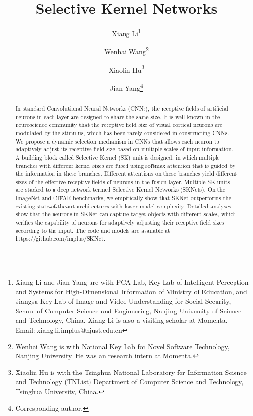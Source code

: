 \documentclass[10pt,twocolumn,letterpaper]{article}
\begin{document}
	
\title{Selective Kernel Networks}
\author[1,2]{Xiang Li\thanks{Xiang Li and Jian Yang are with PCA Lab, Key Lab of Intelligent Perception and Systems for High-Dimensional Information of Ministry of Education, and Jiangsu Key Lab of Image and Video Understanding for Social Security, School of Computer Science and Engineering, Nanjing University of Science and Technology, China. Xiang Li is also a visiting scholar at Momenta. Email: xiang.li.implus@njust.edu.cn}}
\author[3,2]{Wenhai Wang\thanks{Wenhai Wang is with National Key Lab for Novel Software Technology, Nanjing University. He was an research intern at Momenta.}}
\author[4]{Xiaolin Hu\thanks{Xiaolin Hu is with the Tsinghua National Laboratory for Information Science and Technology (TNList) Department of Computer Science and Technology, Tsinghua University, China.}}
\author[1]{Jian Yang\thanks{Corresponding author.}}


\maketitle
\begin{abstract}
	In standard Convolutional Neural Networks (CNNs), the receptive fields of artificial neurons in each layer are designed to share the same size. It is well-known in the neuroscience community that  the receptive field size of visual cortical neurons are modulated by the stimulus, which has been rarely considered in constructing CNNs. We propose a dynamic selection mechanism in CNNs that allows each neuron to adaptively adjust its receptive field size based on multiple scales of input information. A building block called Selective Kernel (SK) unit is designed, in which multiple branches with different kernel sizes are fused using softmax attention that is guided by the information in these branches. Different attentions on these branches yield different sizes of the effective receptive fields of neurons in the fusion layer. Multiple SK units are stacked to a deep network termed Selective Kernel Networks (SKNets). On the ImageNet and CIFAR benchmarks, we empirically show that SKNet outperforms the existing state-of-the-art architectures with lower model complexity. Detailed analyses show that the neurons in SKNet can capture target objects with different scales, which verifies the capability of neurons for adaptively adjusting their receptive field sizes according to the input. The code and models are available at https://github.com/implus/SKNet. 
\end{abstract}
	
\end{document}
